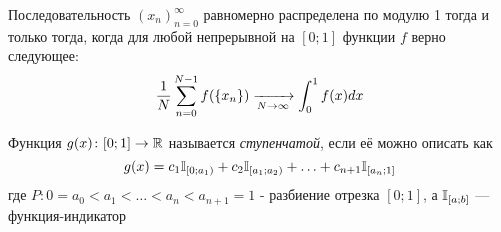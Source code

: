 \begin{theorem}
	Последовательность $(x_n)_{n = 0}^\infty$ равномерно распределена по модулю 1 тогда и только тогда, когда для любой непрерывной на $[0; 1]$ функции $f$ верно следующее:
	\[
		\frac{1}{N} \sum\limits_{n = 0}^{N - 1} f(\{x_n\}) \xrightarrow[N \to \infty]{} \int_0^1 f(x)dx
	\]
\end{theorem}

\begin{definition}
	Функция $g(x) \colon [0; 1] \to \mathbb{R}$ называется \textit{ступенчатой}, если её можно описать как
	\[
		g(x) = c_1 \mathbb{I}_{[0; a_1)} + c_2 \mathbb{I}_{[a_1; a_2)} + \ldots + c_{n + 1} \mathbb{I}_{[a_n; 1]}
	\]
	где $P \colon 0 = a_0 < a_1 < \ldots < a_n < a_{n + 1} = 1$ - разбиение отрезка $[0; 1]$, а $\mathbb{I}_{[a; b]}$ --- функция-индикатор
\end{definition}

